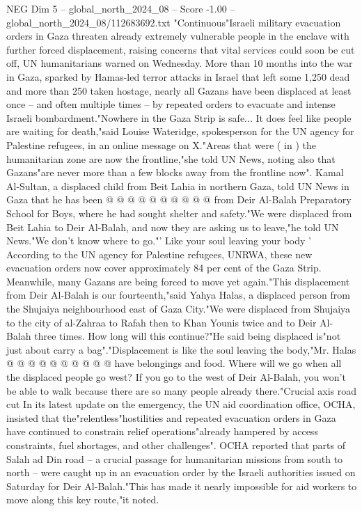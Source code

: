 \begin{textsample}{NEG Dim 5 – global\_north\_2024\_08 – Score -1.00 – global\_north\_2024\_08/112683692.txt}  \label{ex:f5_neg_064}
"Continuous"Israeli military evacuation orders in Gaza threaten already extremely vulnerable people in the enclave with further forced displacement, raising concerns that vital services could soon be cut off, UN humanitarians warned on Wednesday.
More than 10 months into the war in Gaza, sparked by Hamas-led terror attacks in Israel that left some 1,250 dead and more than 250 taken hostage, nearly all Gazans have been displaced at least once -- and often multiple times -- by repeated orders to evacuate and intense Israeli bombardment."Nowhere in the Gaza Strip is safe...
It does feel like people are waiting for death,"said Louise Wateridge, spokesperson for the UN agency for Palestine refugees, in an online message on X."Areas that were ( in ) the humanitarian zone are now the frontline,"she told UN News, noting also that Gazans"are never more than a few blocks away from the frontline now".
Kamal Al-Sultan, a displaced child from Beit Lahia in northern Gaza, told UN News in Gaza that he has been @ @ @ @ @ @ @ @ @ @ from Deir Al-Balah Preparatory School for Boys, where he had sought shelter and safety."We were displaced from Beit Lahia to Deir Al-Balah, and now they are asking us to leave,"he told UN News."We don't know where to go."' Like your soul leaving your body ' According to the UN agency for Palestine refugees, UNRWA, these new evacuation orders now cover approximately 84 per cent of the Gaza Strip.
Meanwhile, many Gazans are being forced to move yet again."This displacement from Deir Al-Balah is our fourteenth,"said Yahya Halas, a displaced person from the Shujaiya neighbourhood east of Gaza City."We were displaced from Shujaiya to the city of al-Zahraa to Rafah then to Khan Younis twice and to Deir Al-Balah three times.
How long will this continue?"He said being displaced is"not just about carry a bag"."Displacement is like the soul leaving the body,"Mr.
Halas @ @ @ @ @ @ @ @ @ @ have belongings and food.
Where will we go when all the displaced people go west?
If you go to the west of Deir Al-Balah, you won't be able to walk because there are so many people already there."Crucial axis road cut In its latest update on the emergency, the UN aid coordination office, OCHA, insisted that the"relentless"hostilities and repeated evacuation orders in Gaza have continued to constrain relief operations"already hampered by access constraints, fuel shortages, and other challenges".
OCHA reported that parts of Salah ad Din road -- a crucial passage for humanitarian missions from south to north -- were caught up in an evacuation order by the Israeli authorities issued on Saturday for Deir Al-Balah."This has made it nearly impossible for aid workers to move along this key route,"it noted.

\end{textsample}
